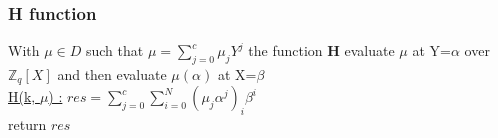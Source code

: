 \subsubsection{H function}
With $\mu \in D$ such that $\mu = \sum_{j=0}^{c}\mu_j Y^j$ the function \textbf{H} evaluate $\mu$ at Y=$\alpha$ over $\mathbb{Z}_q[X]$ and then evaluate $\mu(\alpha)$ at X=$\beta$ \\
\underline{H(k, $\mu$) :} 
\tabNormal $res = \sum_{j=0}^{c}\sum_{i=0}^{N}(\mu_j \alpha^j)_i \beta^i$ \\
\tabNormal return $res$  \\
